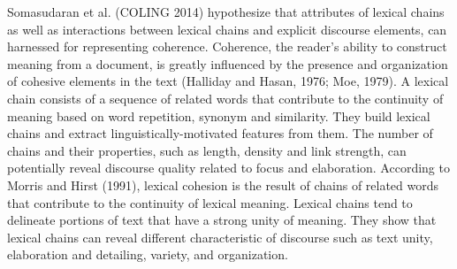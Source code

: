 Somasudaran et al. (COLING 2014) hypothesize that attributes of lexical chains as well as interactions between lexical chains and explicit discourse elements, can harnessed for representing coherence. 
Coherence, the reader's ability to construct meaning from a document, is greatly influenced by the presence and organization of cohesive elements in the text (Halliday and Hasan, 1976; Moe, 1979). 
A lexical chain consists of a sequence of related words that contribute to the continuity of meaning based on word repetition, synonym and similarity. 
They build lexical chains and extract linguistically-motivated features from them. 
The number of chains and their properties, such as length, density and link strength, can potentially reveal discourse quality related to focus and elaboration. 
According to Morris and Hirst (1991), lexical cohesion is the result of chains of related words that contribute to the continuity of lexical meaning. 
Lexical chains tend to delineate portions of text that have a strong unity of meaning. 
They show that lexical chains can reveal different characteristic of discourse such as text unity, elaboration and detailing, variety, and organization. 


